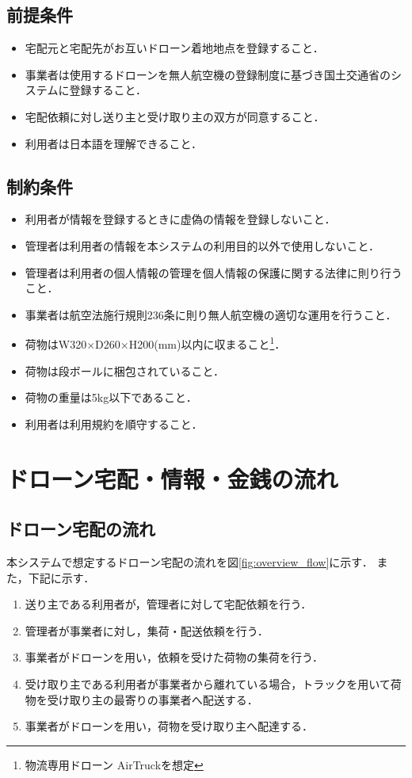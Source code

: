 \documentclass[a4paper, titlepage]{jsarticle}
\begin{document}
\subsection{前提条件}
\begin{itemize}
  \item 宅配元と宅配先がお互いドローン着地地点を登録すること．
  \item 事業者は使用するドローンを無人航空機の登録制度に基づき国土交通省のシステムに登録すること．
  \item 宅配依頼に対し送り主と受け取り主の双方が同意すること．
  \item 利用者は日本語を理解できること．
\end{itemize}
\subsection{制約条件}
\begin{itemize}
  \item 利用者が情報を登録するときに虚偽の情報を登録しないこと．
  \item 管理者は利用者の情報を本システムの利用目的以外で使用しないこと．
  \item 管理者は利用者の個人情報の管理を個人情報の保護に関する法律\cite{personal_information}に則り行うこと．
  \item 事業者は航空法施行規則236条\cite{aviation_law}に則り無人航空機の適切な運用を行うこと．
  \item 荷物はW320$\times$D260$\times$H200(mm)以内に収まること\footnote{\label{fot:airtruck}物流専用ドローン AirTruck\cite{aeronext_airtruck}を想定}．
  \item 荷物は段ボールに梱包されていること．
  \item 荷物の重量は5kg以下であること．
  \item 利用者は利用規約を順守すること．
\end{itemize}
\section{ドローン宅配・情報・金銭の流れ}

\subsection{ドローン宅配の流れ}
本システムで想定するドローン宅配の流れを図\ref{fig:overview_flow}に示す．
また，下記に示す．

\begin{enumerate}[label=\raise0.2ex\hbox{\textcircled{\scriptsize{\arabic*}}}]
  \item 送り主である利用者が，管理者に対して宅配依頼を行う．
  \item 管理者が事業者に対し，集荷・配送依頼を行う．
  \item 事業者がドローンを用い，依頼を受けた荷物の集荷を行う．
  \item 受け取り主である利用者が事業者から離れている場合，トラックを用いて荷物を受け取り主の最寄りの事業者へ配送する．
  \item 事業者がドローンを用い，荷物を受け取り主へ配達する．
\end{enumerate}
\end{document}
